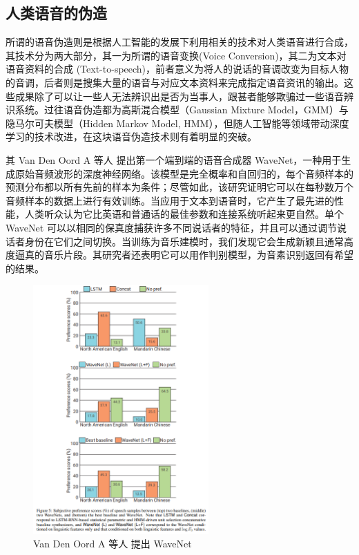 \subsection{人类语音的伪造}

所谓的语音伪造则是根据人工智能的发展下利用相关的技术对人类语音进行合成，其技术分为两大部分，其一为所谓的语音变换(Voice Conversion)，其二为文本对语音资料的合成 (Text-to-speech)，前者意义为将人的说话的音调改变为目标人物的音调，后者则是搜集大量的语音与对应文本资料来完成指定语音资讯的输出。这些成果除了可以让一些人无法辨识出是否为当事人，跟甚者能够欺骗过一些语音辨识系统。过往语音伪造都为高斯混合模型（Gaussian Mixture Model，GMM）与隐马尔可夫模型（Hidden Markov Model, HMM），但随人工智能等领域带动深度学习的技术改进，在这块语音伪造技术则有着明显的突破。

其 Van Den Oord A 等人 提出第一个端到端的语音合成器 WaveNet，一种用于生成原始音频波形的深度神经网络。该模型是完全概率和自回归的，每个音频样本的预测分布都以所有先前的样本为条件；尽管如此，该研究证明它可以在每秒数万个音频样本的数据上进行有效训练。当应用于文本到语音时，它产生了最先进的性能，人类听众认为它比英语和普通话的最佳参数和连接系统听起来更自然。单个 WaveNet 可以以相同的保真度捕获许多不同说话者的特征，并且可以通过调节说话者身份在它们之间切换。当训练为音乐建模时，我们发现它会生成新颖且通常高度逼真的音乐片段。其研究者还表明它可以用作判别模型，为音素识别返回有希望的结果。

\begin{figure}[htb]
\centering 
\includegraphics[width=0.60\textwidth]{img/ch1m11.png} 
\caption{Van Den Oord A 等人 提出 WaveNet}
\label{Test}
\end{figure}

